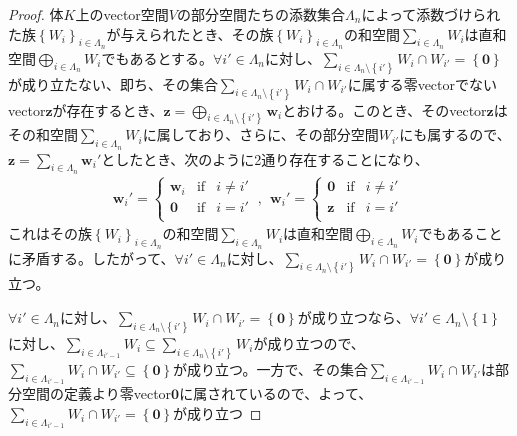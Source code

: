 \documentclass[dvipdfmx]{jsarticle}
\begin{document}
\begin{proof}
体$K$上のvector空間$V$の部分空間たちの添数集合$\varLambda_{n}$によって添数づけられた族$\left\{ W_{i} \right\}_{i \in \varLambda_{n}}$が与えられたとき、その族$\left\{ W_{i} \right\}_{i \in \varLambda_{n}}$の和空間$\sum_{i \in \varLambda_{n}} W_{i}$は直和空間$\bigoplus_{i \in \varLambda_{n}} W_{i}$でもあるとする。$\forall i' \in \varLambda_{n}$に対し、$\sum_{i \in \varLambda_{n} \setminus \left\{ i' \right\}} W_{i} \cap W_{i'} = \left\{ \mathbf{0} \right\}$が成り立たない、即ち、その集合$\sum_{i \in \varLambda_{n} \setminus \left\{ i' \right\}} W_{i} \cap W_{i'}$に属する零vectorでないvector$\mathbf{z}$が存在するとき、$\mathbf{z} = \bigoplus_{i \in \varLambda_{n} \setminus \left\{ i' \right\}} \mathbf{w}_{i}$とおける。このとき、そのvector$\mathbf{z}$はその和空間$\sum_{i \in \varLambda_{n}} W_{i}$に属しており、さらに、その部分空間$W_{i'}$にも属するので、$\mathbf{z} = \sum_{i \in \varLambda_{n}} \mathbf{w}_{i}'$としたとき、次のように2通り存在することになり、
\begin{align*}
\mathbf{w}_{i}' = \left\{ \begin{matrix}
\mathbf{w}_{i} & \mathrm{if} & i \neq i' \\
\mathbf{0} & \mathrm{if} & i = i' \\
\end{matrix} \right.\ ,\ \ \mathbf{w}_{i}' = \left\{ \begin{matrix}
\mathbf{0} & \mathrm{if} & i \neq i' \\
\mathbf{z} & \mathrm{if} & i = i' \\
\end{matrix} \right.\ 
\end{align*}
これはその族$\left\{ W_{i} \right\}_{i \in \varLambda_{n}}$の和空間$\sum_{i \in \varLambda_{n}} W_{i}$は直和空間$\bigoplus_{i \in \varLambda_{n}} W_{i}$でもあることに矛盾する。したがって、$\forall i' \in \varLambda_{n}$に対し、$\sum_{i \in \varLambda_{n} \setminus \left\{ i' \right\}} W_{i} \cap W_{i'} = \left\{ \mathbf{0} \right\}$が成り立つ。\par
$\forall i' \in \varLambda_{n}$に対し、$\sum_{i \in \varLambda_{n} \setminus \left\{ i' \right\}} W_{i} \cap W_{i'} = \left\{ \mathbf{0} \right\}$が成り立つなら、$\forall i' \in \varLambda_{n} \setminus \left\{ 1 \right\}$に対し、$\sum_{i \in \varLambda_{i' - 1}} W_{i} \subseteq \sum_{i \in \varLambda_{n} \setminus \left\{ i' \right\}} W_{i}$が成り立つので、$\sum_{i \in \varLambda_{i' - 1}} W_{i} \cap W_{i'} \subseteq \left\{ \mathbf{0} \right\}$が成り立つ。一方で、その集合$\sum_{i \in \varLambda_{i' - 1}} W_{i} \cap W_{i'}$は部分空間の定義より零vector$\mathbf{0}$に属されているので、よって、$\sum_{i \in \varLambda_{i' - 1}} W_{i} \cap W_{i'} = \left\{ \mathbf{0} \right\}$が成り立つ\par

\end{proof}
\end{document}
